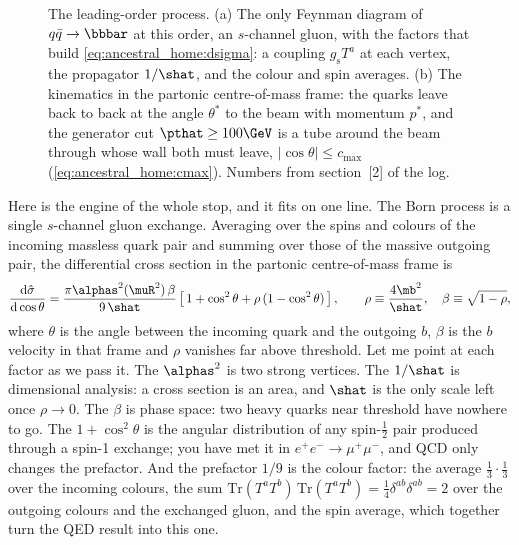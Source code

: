 \begin{figure}[htbp]\centering
\resizebox{\textwidth}{!}{}
\caption[The leading-order diagram and the kinematics of the partonic frame]{The leading-order process. (a) The only Feynman diagram of $q\bar q\to\bbbar$ at this order, an $s$-channel gluon, with the factors that build \cref{eq:ancestral_home:dsigma}: a coupling $g_{\mathrm s}T^a$ at each vertex, the propagator $1/\shat$, and the colour and spin averages. (b) The kinematics in the partonic centre-of-mass frame: the quarks leave back to back at the angle $\theta^*$ to the beam with momentum $p^*$, and the generator cut $\pthat\ge100\GeV$ is a tube around the beam through whose wall both must leave, $|\cos\theta|\le c_{\max}$ (\cref{eq:ancestral_home:cmax}). Numbers from section~[2] of the  log.}
\label{fig:ancestral_home:feynman_qqbar}
\end{figure}

Here is the engine of the whole stop, and it fits on one line. The Born
process is a single $s$-channel gluon exchange. Averaging over the spins and
colours of the incoming massless quark pair and summing over those of the
massive outgoing pair, the differential cross section in the partonic
centre-of-mass frame is~\cite{ParticleDataGroup:2024cfk}
\begin{equation}
  \frac{\mathrm{d}\hat\sigma}{\mathrm{d}\cos\theta}
  = \frac{\pi\alphas^2(\muR^2)\,\beta}{9\,\shat}
    \left[\,1+\cos^2\theta+\rho\,(1-\cos^2\theta)\,\right],
  \qquad
  \rho\equiv\frac{4\mb^2}{\shat},\quad \beta\equiv\sqrt{1-\rho},
  \label{eq:ancestral_home:dsigma}
\end{equation}
where $\theta$ is the angle between the incoming quark and the outgoing $b$,
$\beta$ is the $b$ velocity in that frame and $\rho$ vanishes far above
threshold. Let me point at each factor as we pass it. The $\alphas^2$ is two
strong vertices. The $1/\shat$ is dimensional analysis: a cross section is an
area, and $\shat$ is the only scale left once $\rho\to0$. The $\beta$ is
phase space: two heavy quarks near threshold have nowhere to go. The
$1+\cos^2\theta$ is the angular distribution of any spin-$\tfrac12$ pair
produced through a spin-1 exchange; you have met it in $e^+e^-\to\mu^+\mu^-$,
and QCD only changes the prefactor. And the prefactor $1/9$ is the colour
factor: the average $\tfrac13\cdot\tfrac13$ over the incoming colours, the
sum $\mathrm{Tr}(T^aT^b)\,\mathrm{Tr}(T^aT^b)=\tfrac14\delta^{ab}\delta^{ab}=2$
over the outgoing colours and the exchanged gluon, and the spin average, which
together turn the QED result into this one.

